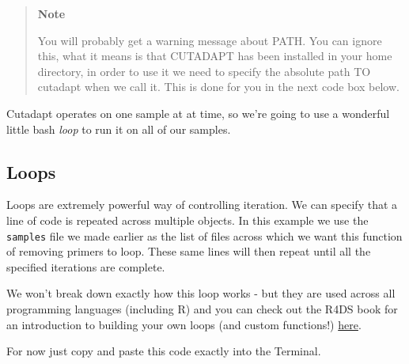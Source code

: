 \documentclass[
]{book}
\newenvironment{Shaded}{\begin{snugshade}}{\end{snugshade}}
\newcommand{\AttributeTok}[1]{\textcolor[rgb]{0.13,0.29,0.53}{#1}}
\newcommand{\BuiltInTok}[1]{#1}
\newcommand{\ControlFlowTok}[1]{\textcolor[rgb]{0.13,0.29,0.53}{\textbf{#1}}}
\newcommand{\DataTypeTok}[1]{\textcolor[rgb]{0.13,0.29,0.53}{#1}}
\newcommand{\DecValTok}[1]{\textcolor[rgb]{0.00,0.00,0.81}{#1}}
\newcommand{\ExtensionTok}[1]{#1}
\newcommand{\FunctionTok}[1]{\textcolor[rgb]{0.13,0.29,0.53}{\textbf{#1}}}
\newcommand{\KeywordTok}[1]{\textcolor[rgb]{0.13,0.29,0.53}{\textbf{#1}}}
\newcommand{\NormalTok}[1]{#1}
\newcommand{\OperatorTok}[1]{\textcolor[rgb]{0.81,0.36,0.00}{\textbf{#1}}}
\newcommand{\StringTok}[1]{\textcolor[rgb]{0.31,0.60,0.02}{#1}}
\newcommand{\VariableTok}[1]{\textcolor[rgb]{0.00,0.00,0.00}{#1}}
\begin{document}
\begin{quote}
\textbf{Note}

You will probably get a warning message about PATH. You can ignore this, what it means is that CUTADAPT has been installed in your home directory, in order to use it we need to specify the absolute path TO cutadapt when we call it. This is done for you in the next code box below.
\end{quote}

Cutadapt operates on one sample at at time, so we're going to use a wonderful little bash \emph{loop} to run it on all of our samples.

\hypertarget{loops}{%
\subsection{Loops}\label{loops}}

Loops are extremely powerful way of controlling iteration. We can specify that a line of code is repeated across multiple objects. In this example we use the \texttt{samples} file we made earlier as the list of files across which we want this function of removing primers to loop. These same lines will then repeat until all the specified iterations are complete.

We won't break down exactly how this loop works - but they are used across all programming languages (including R) and you can check out the R4DS book for an introduction to building your own loops (and custom functions!) \href{https://r4ds.had.co.nz/iteration.html}{here}.

For now just copy and paste this code exactly into the Terminal.

\begin{Shaded}
\end{Shaded}
\end{document}
